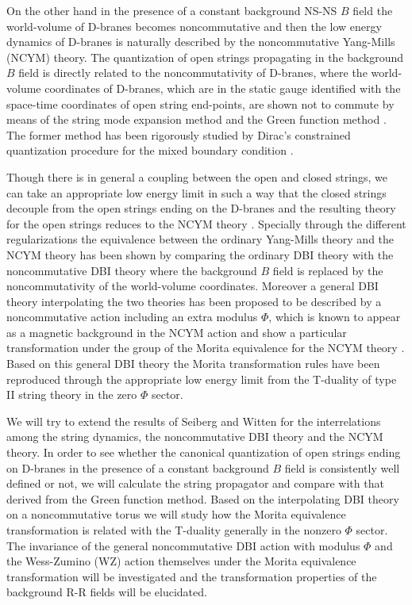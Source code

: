 \documentclass[12pt,a4paper]{article}
\begin{document}
On the other hand in the presence of a constant background NS-NS $B$ field
the world-volume of D-branes becomes noncommutative \cite{DH,AAS,CH}
and then the low energy dynamics of D-branes is naturally described by 
the noncommutative Yang-Mills (NCYM) theory. The quantization of open
strings propagating in the background $B$ field is directly related to the
noncommutativity of D-branes, where the world-volume coordinates of 
D-branes, which are in the static gauge identified with
 the space-time coordinates of open string 
end-points, are shown not to commute by means of the string mode expansion
method \cite{AAS,CH,FZ} and the Green function method \cite{SW}. 
The former method has been rigorously studied 
by Dirac's constrained quantization
procedure for the mixed boundary condition \cite{ACKL}.

Though there is in general a coupling between the open and closed strings,
we can take an appropriate low energy limit in such a way that the closed
strings decouple from the open strings ending on the D-branes
and the resulting theory for the open strings reduces to
the NCYM theory \cite{SW}. Specially through the different 
regularizations the equivalence between the ordinary Yang-Mills theory 
and the NCYM theory has been shown by comparing the ordinary DBI theory
with the noncommutative DBI theory where the background $B$ field is 
replaced by the noncommutativity of the world-volume coordinates.
Moreover a general DBI theory interpolating the two theories has been 
proposed to be described by a noncommutative action including an extra 
modulus $\Phi$, which is known to appear as a magnetic background
in the NCYM action and show a
particular transformation under the group of the Morita equivalence for
the NCYM theory \cite{KS,PS}. Based on this general DBI theory the 
Morita transformation rules have been reproduced through the appropriate
low energy limit from the T-duality of type II string theory in the zero
$\Phi$ sector.

We will try to extend the results of Seiberg and Witten \cite{SW} for 
the interrelations among the string dynamics, the noncommutative DBI 
theory and the NCYM theory. In order to see whether the canonical
quantization of open strings ending on D-branes in the presence of a 
constant background $B$ field \cite{CH} 
is consistently well defined or not, we will calculate the string 
propagator and compare with that derived from
the Green function method. Based on the interpolating DBI theory on a 
noncommutative torus we will study how the Morita equivalence 
transformation is related with the T-duality generally in the nonzero
$\Phi$ sector. The invariance of 
the general noncommutative DBI action with
modulus $\Phi$ and the Wess-Zumino (WZ) action themselves under 
the Morita equivalence transformation will be investigated and 
the transformation properties of the  background R-R fields will 
be elucidated.
\end{document}
